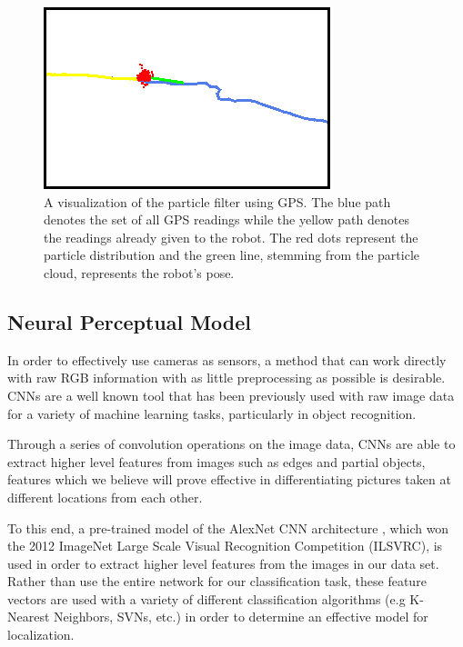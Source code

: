 \documentclass[letterpaper, 12 pt, conference]{ieeeconf}  %
\begin{document}
\begin{figure}[h]
\centering
\includegraphics[scale=0.70]{particle_filter_visual}
\caption{A visualization of the particle filter using GPS. The blue path denotes the set of all GPS readings while the yellow path denotes the readings already given to the robot. The red dots represent the particle distribution and the green line, stemming from the particle cloud, represents the robot's pose.}
\end{figure}

\subsection{Neural Perceptual Model}
In order to effectively use cameras as sensors, a method that can work directly with raw RGB information with as little preprocessing as possible is desirable. CNNs are a well known tool that has been previously used with raw image data for a variety of machine learning tasks, particularly in object recognition. 
\par
Through a series of convolution operations on the image data, CNNs are able to extract higher level features from images such as edges and partial objects, features which we believe will prove effective in differentiating pictures taken at different locations from each other. 
\par
To this end, a pre-trained model of the AlexNet CNN architecture \cite{AlexNet}, which won the 2012 ImageNet Large Scale Visual Recognition Competition (ILSVRC), is used in order to extract higher level features from the images in our data set. Rather than use the entire network for our classification task, these feature vectors are used with a variety of different classification algorithms (e.g K-Nearest Neighbors, SVNs, etc.) in order to determine an effective model for localization.  
\end{document}
